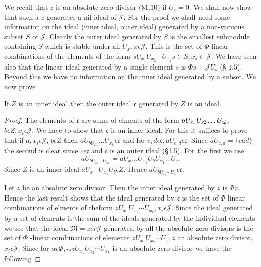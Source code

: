 We recall that $z$ is an absolute zero divisor (\S $1.10$) if
$U_z=0$. We shall now show that such a $z$ generates a nil ideal of
$\mathscr{J}$. For the proof we shall need some information on the
ideal (inner ideal, outer ideal) generated by a non-vacuous subset $S$
of $\mathscr{J}$. Clearly the outer ideal generated by $S$ is the
smallest submodule containing $S$ which is stable under all
$U_x,x\epsilon \mathscr{J}$. This is the set of $\Phi$-linear
combinations of the elements of the form $sU_{x_{1}}U_{x_{2}}\cdots
U_{x_{k}} s\in S, x_i \in \mathscr{J}$. We have seen also that the linear ideal
generated by a single element $s$ is $\Phi s+\mathscr{J}U_s$ (\S
$1.5$). Beyond this we have no information on the inner ideal
generated by a subset. We now prove

\begin{lemma}\label{c3:lem6}
If $Z$ is an inner ideal then the outer ideal
$\mathfrak{c}$ generated by $Z$ is an ideal.
\end{lemma}

\begin{proof}
The elements of $\mathfrak{c}$ are sums of elments of the form
$bU_{x1}U_{x2}\ldots\break U_{xk}$, $b\epsilon Z, x_i\epsilon
\mathscr{J}$. We have to show that $\mathfrak{c}$ is an inner
ideal. For this it suffices to prove that if $a,x_i\epsilon
\mathscr{J}$, $b\epsilon Z$ then
$aU_{bU_{x1}}\ldots U_{x_{k}}\epsilon \mathfrak{c}$ and for
$c,d\epsilon \mathfrak{c}, aU_{c,d}\epsilon \mathfrak{c}$. Since
$aU_{c,d}=\{cad\}$ the second is clear since $c\epsilon \mathfrak{c}$
and $\mathfrak{c}$ is an outer ideal (\S 1.5). For the first we use
$$
aU_{bU_{x_{1}}\ldots U_{x_{k}}}=aU_x\ldots U_{x_{1}}U_bU_{x_{1}}\ldots U_x.
$$
Since $Z$ is an inner ideal $aU_x\cdots
U_{x_{1}}U_b\epsilon Z$. Hence
$aU_{bU_{x_{1}}\cdots U_x}\epsilon \mathfrak{c}$.

Let $z$ be an absolute zero divisor. Then the inner ideal generated by
$z$ is $\Phi z$. Hence the last result shows that the ideal generated
by $z$ is the set of $\Phi$ linear combinations of elments of
the\pageoriginale form $zU_{x_{1}}U_{x_{2}}\cdots
U_{x_{k}},x_i\epsilon \mathscr{J}$. Since the ideal generated by a set
of elements is the sum of the ideals generated by the individual
elements we see that the ideal $\mathfrak{M}=zer \mathscr{J}$
generated by all the absolute zero divisors is the set of $\Phi$
-linear combinations of elements $zU_{x_{1}}U_{x_{2}}\cdots U_x, z$
an absolute zero divisor, $x_i\epsilon \mathscr{J}$. Since for $\alpha
\epsilon \Phi, \alpha z U_{x_{1}}U_{x_{2}}\cdots U_{x_k}$ is an absolute
zero divisor we have the following 
\end{proof}

